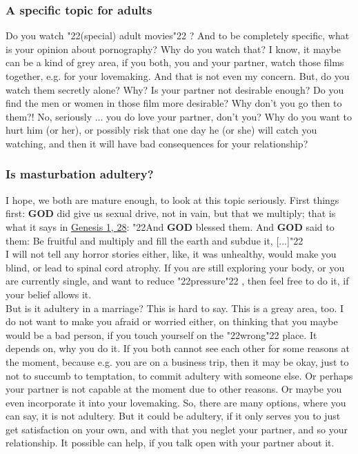 \documentclass[12pt,a5paper]{article}
\newcommand{\God}[0]{\textbf{GOD}}
\newcommand{\q}[1]{\char"22{#1}\char"22 }
\begin{document}
	\subsubsection{A specific topic for adults}
		Do you watch \q{(special) adult movies}?
		And to be completely specific,
		what is your opinion about pornography?
		Why do you watch that?
		I know,
		it maybe can be a kind of grey area,
		if you both,
		you and your partner,
		watch those films together,
		e.g. for your lovemaking.
		And that is not even my concern.
		But,
		do you watch them secretly alone?
		Why?
		Is your partner not desirable enough?
		Do you find the men or women in those film more desirable?
		Why don't you go then to them?!
		No,
		seriously ...
		you do love your partner, don't you?
		Why do you want to hurt him (or her),
		or possibly risk that one day he (or she) will catch you watching,
		and then it will have bad consequences for your relationship?
		
	\subsubsection{Is masturbation adultery?}
		I hope,
		we both are mature enough,
		to look at this topic seriously.
		First things first:
		{\God} did give us sexual drive,
		not in vain,
		but that we multiply;
		that is what it says in \href{https://www.die-bibel.de/bibeln/online-bibeln/lesen/ESV/GEN.1/Genesis-1}{Genesis 1, 28}:
		\q{And {\God} blessed them.
		And {\God} said to them:
		Be fruitful and multiply and fill the earth and subdue it, [...]}
		\\
		I will not tell any horror stories either,
		like,
		it was unhealthy,
		would make you blind,
		or lead to spinal cord atrophy.
		If you are still exploring your body,
		or you are currently single,
		and want to reduce \q{pressure},
		then feel free to do it,
		if your belief allows it.
		\\
		But is it adultery in a marriage?
		This is hard to say.
		This is a greay area, too.
		I do not want to make you afraid or worried either,
		on thinking that you maybe would be a bad person,
		if you touch yourself on the \q{wrong} place.
		It depends on,
		why you do it.
		If you both cannot see each other for some reasons at the moment,
		because e.g. you are on a business trip,
		then it may be okay,
		just to not to succumb to temptation,
		to commit adultery with someone else.
		Or perhaps your partner is not capable at the moment due to other reasons.
		Or maybe you even incorporate it into your lovemaking.
		So,
		there are many options,
		where you can say,
		it is not adultery.
		But it could be adultery,
		if it only serves you to just get satisfaction on your own,
		and with that you neglet your partner,
		and so your relationship.
		It possible can help,
		if you talk open with your partner about it.
		
\end{document}
